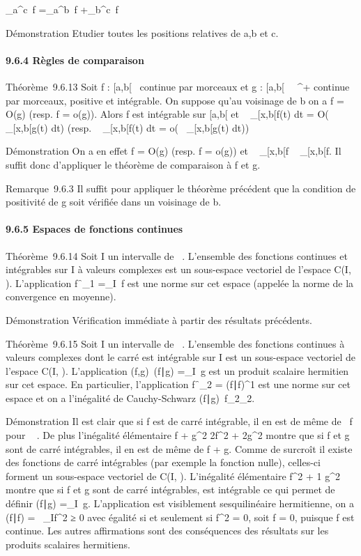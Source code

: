 \documentclass[]{article}
\begin{document}
\int  _a^c~f
=\int  _a^b~f
+\int  _b^c~f

Démonstration Etudier toutes les positions relatives de a,b et c.

\paragraph{9.6.4 Règles de comparaison}

Théorème~9.6.13 Soit f : {[}a,b{[}\rightarrow~  continue par morceaux et g :
{[}a,b{[}\rightarrow~ ~^+ continue par morceaux, positive et intégrable.
On suppose qu'au voisinage de b on a f = O(g) (resp. f = o(g)). Alors f
est intégrable sur {[}a,b{[} et \int ~
_{[}x,b{[}f(t) dt = O(\int ~
_{[}x,b{[}g(t) dt) (resp. \int ~
_{[}x,b{[}f(t) dt = o(\int ~
_{[}x,b{[}g(t) dt))

Démonstration On a en effet f = O(g) (resp.
f = o(g)) et \left
\int ~
_{[}x,b{[}f\right
\leq\int ~
_{[}x,b{[}f. Il suffit donc d'appliquer le
théorème de comparaison à f et g.

Remarque~9.6.3 Il suffit pour appliquer le théorème précédent que la
condition de positivité de g soit vérifiée dans un voisinage de b.

\paragraph{9.6.5 Espaces de fonctions continues}

Théorème~9.6.14 Soit I un intervalle de ~. L'ensemble des fonctions
continues et intégrables sur I à valeurs complexes est un sous-espace
vectoriel de l'espace C(I, ). L'application
f\mapsto~\f_1
=\int  _I~f est une
norme sur cet espace (appelée la norme de la convergence en moyenne).

Démonstration Vérification immédiate à partir des résultats précédents.

Théorème~9.6.15 Soit I un intervalle de ~. L'ensemble des fonctions
continues à valeurs complexes dont le carré est intégrable sur I est un
sous-espace vectoriel de l'espace C(I, ). L'application
(f,g)\mapsto~(f\mathrel∣g)
=\int  _I\overlinef~g
est un produit scalaire hermitien sur cet espace. En particulier,
l'application
f\mapsto~\f_2
= (f∣f)^1 est une norme sur cet
espace et on a l'inégalité de Cauchy-Schwarz
(f∣g)\leq\
f_2\g_2.

Démonstration Il est clair que si f est de carré intégrable, il en est
de même de \alpha~f pour \alpha~ \in \mathbb{C}. De plus l'inégalité élémentaire f +
g^2 \leq 2f^2 +
2g^2 montre que si f et g sont de carré
intégrables, il en est de même de f + g. Comme de surcroît il existe des
fonctions de carré intégrables (par exemple la fonction nulle),
celles-ci forment un sous-espace vectoriel de C(I, ). L'inégalité
élémentaire \overlinefg\leq 1
 f^2 + 1
\over 2 g^2 montre que
si f et g sont de carré intégrables, \overlinegf est
intégrable ce qui permet de définir (f∣g)
=\int  _I\overlinef~g.
L'application est visiblement sesquilinéaire hermitienne, on a
(f∣f) =\int ~
_If^2 ≥ 0 avec égalité si et
seulement si f^2 = 0, soit f = 0, puisque
f est continue. Les autres affirmations sont des conséquences des
résultats sur les produits scalaires hermitiens.
\end{document}
